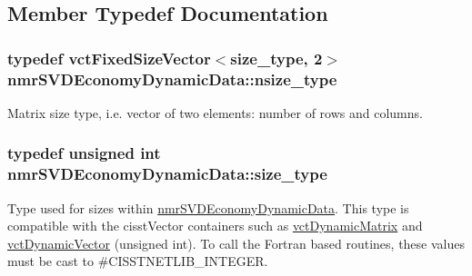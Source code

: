 \subsection{Member Typedef Documentation}
\hypertarget{classnmr_s_v_d_economy_dynamic_data_a237cfc6761af61ac2016b2b1e71284f1}{
\subsubsection[{nsize\-\_\-type}]{\setlength{\rightskip}{0pt plus 5cm}typedef {\bf vct\-Fixed\-Size\-Vector}$<${\bf size\-\_\-type}, 2$>$ {\bf nmr\-S\-V\-D\-Economy\-Dynamic\-Data\-::nsize\-\_\-type}}}\label{classnmr_s_v_d_economy_dynamic_data_a237cfc6761af61ac2016b2b1e71284f1}
Matrix size type, i.\-e. vector of two elements\-: number of rows and columns. \hypertarget{classnmr_s_v_d_economy_dynamic_data_aee8ff15f2e92af24fdc3c7f5908770f3}{
\subsubsection[{size\-\_\-type}]{\setlength{\rightskip}{0pt plus 5cm}typedef unsigned int {\bf nmr\-S\-V\-D\-Economy\-Dynamic\-Data\-::size\-\_\-type}}}\label{classnmr_s_v_d_economy_dynamic_data_aee8ff15f2e92af24fdc3c7f5908770f3}
Type used for sizes within \hyperlink{classnmr_s_v_d_economy_dynamic_data}{nmr\-S\-V\-D\-Economy\-Dynamic\-Data}. This type is compatible with the cisst\-Vector containers such as \hyperlink{classvct_dynamic_matrix}{vct\-Dynamic\-Matrix} and \hyperlink{classvct_dynamic_vector}{vct\-Dynamic\-Vector} (unsigned int). To call the Fortran based routines, these values must be cast to \#\-C\-I\-S\-S\-T\-N\-E\-T\-L\-I\-B\-\_\-\-I\-N\-T\-E\-G\-E\-R. 

